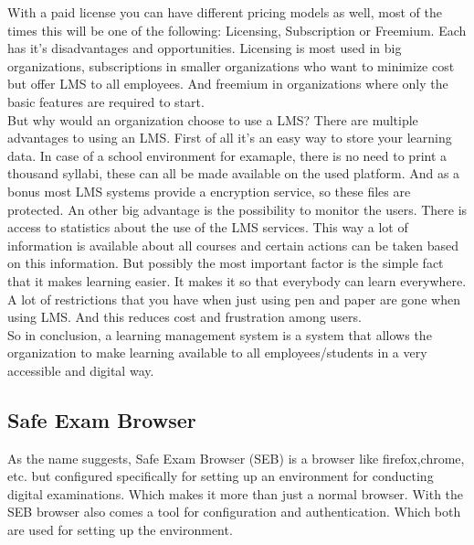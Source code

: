 With a paid license you can have different pricing models as well, most of the times this will be one of the following: Licensing, Subscription or Freemium. Each has it's disadvantages and opportunities. Licensing is most used in big organizations, subscriptions in smaller organizations who want to minimize cost but offer LMS to all employees. And freemium in organizations where only the basic features are required to start.\\

But why would an organization choose to use a LMS? There are multiple advantages to using an LMS. First of all it's an easy way to store your learning data. In case of a school environment for examaple, there is no need to print a thousand syllabi, these can all be made available on the used platform. And as a bonus most LMS systems provide a encryption service, so these files are protected. An other big advantage is the possibility to monitor the users. There is access to statistics about the use of the LMS services. This way a lot of information is available about all courses and certain actions can be taken based on this information.
But possibly the most important factor is the simple fact that it makes learning easier. It makes it so that everybody can learn everywhere. A lot of restrictions that you have when just using pen and paper are gone when using LMS. And this reduces cost and frustration among users.\\

So in conclusion, a learning management system is a system that allows the organization to make learning available to all employees/students in a very accessible and digital way.

\subsection{Safe Exam Browser}
As the name suggests, Safe Exam Browser (SEB)  is a browser like firefox,chrome, etc. but configured specifically for setting up an environment for conducting digital examinations. Which makes it more than just a normal browser. With the SEB browser also comes a tool for configuration and authentication. Which both are used for setting up the environment.\\

